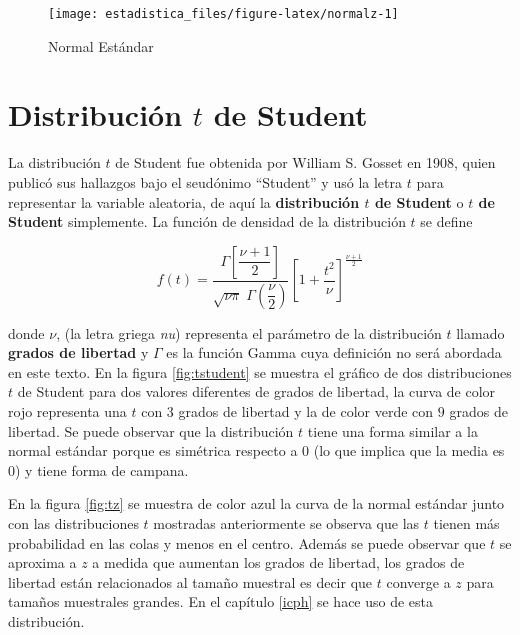 \documentclass[]{book}
\begin{document}
\begin{figure}[h!]

{\centering \texttt{[image: estadistica\_files/figure-latex/normalz-1]} 

}

\caption{Normal Estándar}\label{fig:normalz}
\end{figure}

\hypertarget{distribucion-t-de-student}{%
\section{\texorpdfstring{Distribución \(t\) de Student}{Distribución t de Student}}\label{distribucion-t-de-student}}

La distribución \(t\) de Student fue obtenida por William S. Gosset en 1908, quien publicó sus hallazgos bajo el seudónimo ``Student'' y usó la letra \(t\) para representar la variable aleatoria, de aquí la \textbf{distribución \(t\) de Student} o \textbf{\(t\) de Student} simplemente. La función de densidad de la distribución \(t\) se define

\begin{equation}
f\left(t\right)=\dfrac{\Gamma\left[\dfrac{\nu+1}{2}\right]}{\sqrt{\nu \pi} \; \Gamma\left(\dfrac{\nu}{2}\right)}\left[1 + \dfrac{t^2}{\nu} \right]^{\frac{\nu+1}{2}}
\label{eq:studentpdf}
\end{equation}

donde \(\nu\), (la letra griega \emph{nu}) representa el parámetro de la distribución \(t\) llamado \textbf{grados de libertad} y \(\Gamma\) es la función Gamma cuya definición no será abordada en este texto.
En la figura \ref{fig:tstudent} se muestra el gráfico de dos distribuciones \(t\) de Student para dos valores diferentes de grados de libertad, la curva de color rojo representa una \(t\) con 3 grados de libertad y la de color verde con \(9\) grados de libertad. Se puede observar que la distribución \(t\) tiene una forma similar a la normal estándar porque es simétrica respecto a \(0\) (lo que implica que la media es \(0\)) y tiene forma de campana.

En la figura \ref{fig:tz} se muestra de color azul la curva de la normal estándar junto con las distribuciones \(t\) mostradas anteriormente se observa que las \(t\) tienen más probabilidad en las colas y menos en el centro. Además se puede observar que \(t\) se aproxima a \(z\) a medida que aumentan los grados de libertad, los grados de libertad están relacionados al tamaño muestral es decir que \(t\) converge a \(z\) para tamaños muestrales grandes. En el capítulo \ref{icph} se hace uso de esta distribución.
\end{document}

